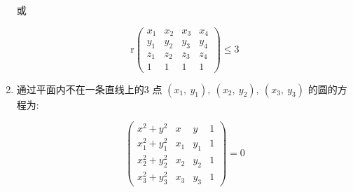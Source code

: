 \begin{enumerate}
		或
		
		$$\mathrm{r}\left(\begin{array}{cccc}
			x_{1} & x_{2} & x_{3} & x_{4} \\
			y_{1} & y_{2} & y_{3} & y_{4} \\
			z_{1} & z_{2} & z_{3} & z_{4} \\
			1 & 1 & 1 & 1
		\end{array}\right) \leqslant 3$$
		
		\item 通过平面内不在一条直线上的$ 3$ 点  $\left(x_{1},\  y_{1}\right),\ \left(x_{2},\  y_{2}\right) ,\   \left(x_{3},\  y_{3}\right) $ 的圆的方程为:
		
		$$\left(\begin{array}{cccc}
			x^{2}+y^{2} & x & y & 1 \\
			x_{1}^{2}+y_{1}^{2} & x_{1} & y_{1} & 1 \\
			x_{2}^{2}+y_{2}^{2} & x_{2} & y_{2} & 1 \\
			x_{3}^{2}+y_{3}^{2} & x_{3} & y_{3} & 1
		\end{array}\right)=0$$

\end{enumerate}
